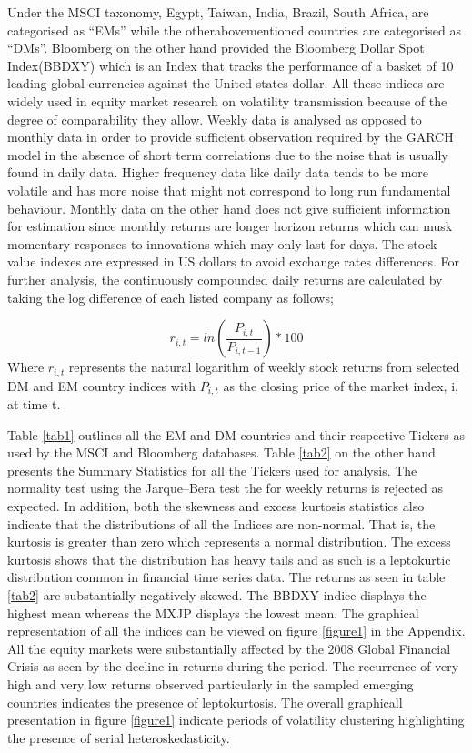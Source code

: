 \documentclass[11pt,preprint, authoryear]{elsarticle}
\numberwithin{equation}{section}
\numberwithin{figure}{section}
\numberwithin{table}{section}
\begin{document}
Under the MSCI taxonomy, Egypt, Taiwan, India, Brazil, South Africa, are
categorised as ``EMs'' while the otherabovementioned countries are
categorised as ``DMs''. Bloomberg on the other hand provided the
Bloomberg Dollar Spot Index(BBDXY) which is an Index that tracks the
performance of a basket of 10 leading global currencies against the
United states dollar. All these indices are widely used in equity market
research on volatility transmission because of the degree of
comparability they allow. Weekly data is analysed as opposed to monthly
data in order to provide sufficient observation required by the GARCH
model in the absence of short term correlations due to the noise that is
usually found in daily data. Higher frequency data like daily data tends
to be more volatile and has more noise that might not correspond to long
run fundamental behaviour. Monthly data on the other hand does not give
sufficient information for estimation since monthly returns are longer
horizon returns which can musk momentary responses to innovations which
may only last for days. The stock value indexes are expressed in US
dollars to avoid exchange rates differences. For further analysis, the
continuously compounded daily returns are calculated by taking the log
difference of each listed company as follows;

\[
r_{i,t} = ln (\frac{P_{i,t}}{P_{i,t-1}})*100  
\] Where \(r_{i,t}\) represents the natural logarithm of weekly stock
returns from selected DM and EM country indices with \(P_{i,t}\) as the
closing price of the market index, i, at time t.

Table \ref{tab1} outlines all the EM and DM countries and their
respective Tickers as used by the MSCI and Bloomberg databases. Table
\ref{tab2} on the other hand presents the Summary Statistics for all the
Tickers used for analysis. The normality test using the Jarque--Bera
test the for weekly returns is rejected as expected. In addition, both
the skewness and excess kurtosis statistics also indicate that the
distributions of all the Indices are non-normal. That is, the kurtosis
is greater than zero which represents a normal distribution. The excess
kurtosis shows that the distribution has heavy tails and as such is a
leptokurtic distribution common in financial time series data. The
returns as seen in table \ref{tab2} are substantially negatively skewed.
The BBDXY indice displays the highest mean whereas the MXJP displays the
lowest mean. The graphical representation of all the indices can be
viewed on figure \ref{figure1} in the Appendix. All the equity markets
were substantially affected by the 2008 Global Financial Crisis as seen
by the decline in returns during the period. The recurrence of very high
and very low returns observed particularly in the sampled emerging
countries indicates the presence of leptokurtosis. The overall
graphicall presentation in figure \ref{figure1} indicate periods of
volatility clustering highlighting the presence of serial
heteroskedasticity.
\end{document}
